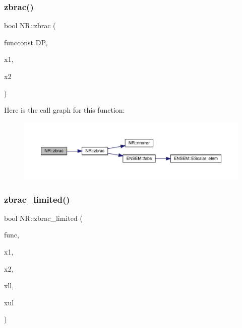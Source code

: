 \subsubsection{\texorpdfstring{zbrac()}{zbrac()}\hspace{0.1cm}{\footnotesize\ttfamily [2/2]}}
{\footnotesize\ttfamily bool N\+R\+::zbrac (\begin{DoxyParamCaption}\item[{\mbox{\hyperlink{namespaceNR_af6ff762dd605ff477b8e52387253a02a}{DP}} }]{funcconst DP,  }\item[{\mbox{\hyperlink{namespaceNR_af6ff762dd605ff477b8e52387253a02a}{DP}} \&}]{x1,  }\item[{\mbox{\hyperlink{namespaceNR_af6ff762dd605ff477b8e52387253a02a}{DP}} \&}]{x2 }\end{DoxyParamCaption})}

Here is the call graph for this function\+:
\nopagebreak
\begin{figure}[H]
\begin{center}
\leavevmode
\includegraphics[width=350pt]{da/d46/namespaceNR_a4dbd7cac092f614af934413917fc22d4_cgraph}
\end{center}
\end{figure}
\mbox{\label{namespaceNR_a01001dd7f12b7d7ef40d7b3f77bc84e7}} 
\subsubsection{\texorpdfstring{zbrac\_limited()}{zbrac\_limited()}\hspace{0.1cm}{\footnotesize\ttfamily [1/2]}}
{\footnotesize\ttfamily bool N\+R\+::zbrac\+\_\+limited (\begin{DoxyParamCaption}\item[{const \mbox{\hyperlink{classNR_1_1ScalFunc}{Scal\+Func}} \&}]{func,  }\item[{\mbox{\hyperlink{namespaceNR_af6ff762dd605ff477b8e52387253a02a}{DP}} \&}]{x1,  }\item[{\mbox{\hyperlink{namespaceNR_af6ff762dd605ff477b8e52387253a02a}{DP}} \&}]{x2,  }\item[{const \mbox{\hyperlink{namespaceNR_af6ff762dd605ff477b8e52387253a02a}{DP}} \&}]{xll,  }\item[{const \mbox{\hyperlink{namespaceNR_af6ff762dd605ff477b8e52387253a02a}{DP}} \&}]{xul }\end{DoxyParamCaption})}

